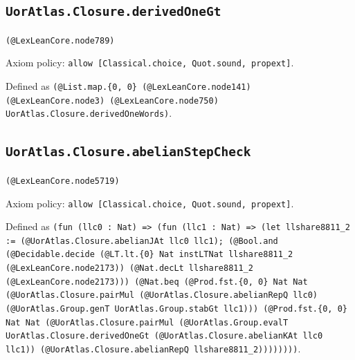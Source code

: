 \documentclass[11pt]{article}
\begin{document}
\subsection*{\texttt{UorAtlas.Closure.derivedOneGt}}
\noindent\texttt{(@LexLeanCore.node789)}\par
\noindent Axiom policy: \texttt{allow [Classical.choice, Quot.sound, propext]}.\par
\noindent Defined as \texttt{(@List.map.\{0, 0\} (@LexLeanCore.node141) (@LexLeanCore.node3) (@LexLeanCore.node750) UorAtlas.Closure.derivedOneWords)}.\par
\subsection*{\texttt{UorAtlas.Closure.abelianStepCheck}}
\noindent\texttt{(@LexLeanCore.node5719)}\par
\noindent Axiom policy: \texttt{allow [Classical.choice, Quot.sound, propext]}.\par
\noindent Defined as \texttt{(fun (llc0 : Nat) => (fun (llc1 : Nat) => (let llshare8811\_2 := (@UorAtlas.Closure.abelianJAt llc0 llc1); (@Bool.and (@Decidable.decide (@LT.lt.\{0\} Nat instLTNat llshare8811\_2 (@LexLeanCore.node2173)) (@Nat.decLt llshare8811\_2 (@LexLeanCore.node2173))) (@Nat.beq (@Prod.fst.\{0, 0\} Nat Nat (@UorAtlas.Closure.pairMul (@UorAtlas.Closure.abelianRepQ llc0) (@UorAtlas.Group.genT UorAtlas.Group.stabGt llc1))) (@Prod.fst.\{0, 0\} Nat Nat (@UorAtlas.Closure.pairMul (@UorAtlas.Group.evalT UorAtlas.Closure.derivedOneGt (@UorAtlas.Closure.abelianKAt llc0 llc1)) (@UorAtlas.Closure.abelianRepQ llshare8811\_2))))))))}.\par
\end{document}
